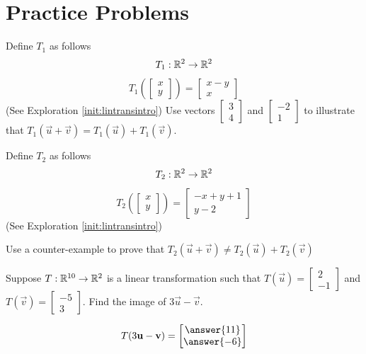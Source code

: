 \documentclass{ximera}
\begin{document}
\section*{Practice Problems}
\begin{problem}\label{prob:sum}
Define $T_1$ as follows 
$$T_1:\mathbb{R}^2\rightarrow\mathbb{R}^2$$
$$T_1\left(\begin{bmatrix}
x\\
y
\end{bmatrix}\right)=\begin{bmatrix}
x-y\\
x
\end{bmatrix}$$
(See Exploration \ref{init:lintransintro})
Use vectors $\begin{bmatrix}3\\4\end{bmatrix}$ and $\begin{bmatrix}-2\\1\end{bmatrix}$ to illustrate that $T_1(\vec{u}+\vec{v}) = T_1(\vec{u})+T_1(\vec{v})$.
\end{problem}

\begin{problem}\label{prob:prob2} Define $T_2$ as follows
$$T_2:\mathbb{R}^2\rightarrow\mathbb{R}^2$$
$$T_2\left(\begin{bmatrix}
x\\
y
\end{bmatrix}\right)=\begin{bmatrix}
-x+y+1\\
y-2
\end{bmatrix}$$
(See Exploration \ref{init:lintransintro})

Use a counter-example to prove that $T_2(\vec{u}+\vec{v}) \neq T_2(\vec{u})+T_2(\vec{v})$
\end{problem}

\begin{problem}\label{prob:imageoflincomb}
Suppose $T:\mathbb{R}^{10}\rightarrow\mathbb{R}^2$ is a linear transformation such that $T(\vec{u})=\begin{bmatrix}2\\-1\end{bmatrix}$ and $T(\vec{v})=\begin{bmatrix}-5\\3\end{bmatrix}$.  Find the image of $3\vec{u}-\vec{v}$.

$$T(3\vec{u}-\vec{v})=\begin{bmatrix}\answer{11}\\\answer{-6}\end{bmatrix}$$
\end{problem}
\end{document}
